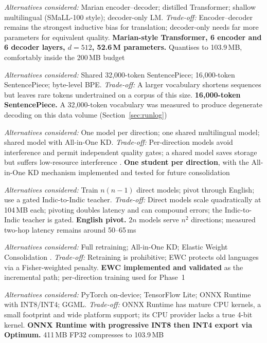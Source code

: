 \emph{Alternatives considered:} Marian encoder--decoder; distilled Transformer; shallow multilingual (SMaLL-100 style); decoder-only LM. \emph{Trade-off:} Encoder--decoder remains the strongest inductive bias for translation; decoder-only needs far more parameters for equivalent quality. \textbf{Marian-style Transformer, 6 encoder and 6 decoder layers, $d=512$, 52.6\,M parameters.} Quantises to 103.9\,MB, comfortably inside the 200\,MB budget

\emph{Alternatives considered:} Shared 32{,}000-token SentencePiece; 16{,}000-token SentencePiece; byte-level BPE. \emph{Trade-off:} A larger vocabulary shortens sequences but leaves rare tokens undertrained on a corpus of this size. \textbf{16{,}000-token SentencePiece.} A 32{,}000-token vocabulary was measured to produce degenerate decoding on this data volume (Section~\ref{sec:runlog})

\emph{Alternatives considered:} One model per direction; one shared multilingual model; shared model with All-in-One KD. \emph{Trade-off:} Per-direction models avoid interference and permit independent quality gates; a shared model saves storage but suffers low-resource interference \cite{ref:aiokd}. \textbf{One student per direction}, with the All-in-One KD mechanism implemented and tested for future consolidation

\emph{Alternatives considered:} Train $n(n-1)$ direct models; pivot through English; use a gated Indic-to-Indic teacher. \emph{Trade-off:} Direct models scale quadratically at 104\,MB each; pivoting doubles latency and can compound errors; the Indic-to-Indic teacher is gated. \textbf{English pivot.} $2n$ models serve $n^2$ directions; measured two-hop latency remains around 50--65\,ms

\emph{Alternatives considered:} Full retraining; All-in-One KD; Elastic Weight Consolidation \cite{ref:continualkd}. \emph{Trade-off:} Retraining is prohibitive; EWC protects old languages via a Fisher-weighted penalty. \textbf{EWC implemented and validated} as the incremental path; per-direction training used for Phase~1

\emph{Alternatives considered:} PyTorch on-device; TensorFlow Lite; ONNX Runtime with INT8/INT4; GGML. \emph{Trade-off:} ONNX Runtime has mature CPU kernels, a small footprint and wide platform support; its CPU provider lacks a true 4-bit kernel. \textbf{ONNX Runtime with progressive INT8 then INT4 export via Optimum.} 411\,MB FP32 compresses to 103.9\,MB

